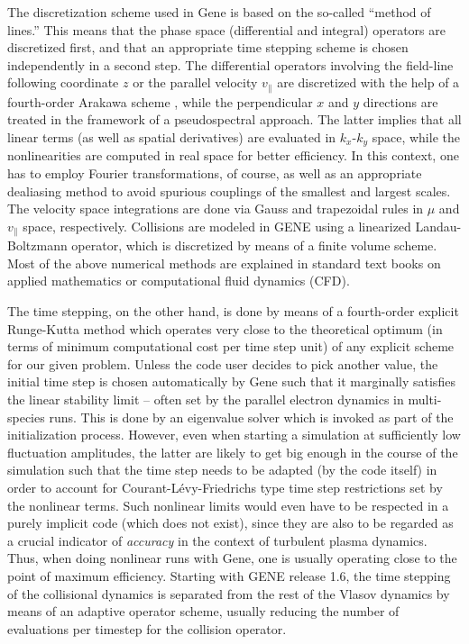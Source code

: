 \documentclass[12pt]{article}
\begin{document}
The discretization scheme used in {\sc Gene} is based on the so-called ``method of lines.'' This
means that the phase space (differential and integral) operators are discretized first, and that
an appropriate time stepping scheme is chosen independently in a second step. The differential
operators involving the field-line following coordinate $z$ or the parallel velocity $v_\|$ are
discretized with the help of a fourth-order Arakawa scheme \cite{Arakawa66}, while the
perpendicular $x$ and $y$ directions are treated in the framework of a pseudospectral approach.
The latter implies that all linear terms (as well as spatial derivatives) are evaluated in
$k_x$-$k_y$ space, while the nonlinearities are computed in real space for better efficiency.
In this context, one has to employ Fourier transformations, of course, as well as an appropriate
dealiasing method to avoid spurious couplings of the smallest and largest scales. The velocity
space integrations are done via Gauss and trapezoidal rules in $\mu$ and $v_\|$ space, respectively.
Collisions are modeled in GENE using a linearized Landau-Boltzmann operator, which is discretized
by means of a finite volume scheme. Most of the above numerical methods are explained in standard 
text books on applied mathematics or computational fluid dynamics (CFD).

The time stepping, on the other hand, is done by means of a fourth-order explicit Runge-Kutta method
which operates very close to the theoretical optimum (in terms of minimum computational cost per
time step unit) of any explicit scheme for our given problem. Unless the code user decides to pick
another value, the initial time step is chosen automatically by {\sc Gene} such that it marginally
satisfies the linear stability limit -- often set by the parallel electron dynamics in multi-species
runs. This is done by an eigenvalue solver which is invoked as part of the initialization process.
However, even when starting a simulation at sufficiently low fluctuation amplitudes, the latter are
likely to get big enough in the course of the simulation such that the time step needs to be adapted
(by the code itself) in order to account for Courant-L\'evy-Friedrichs type time step restrictions
set by the nonlinear terms. Such nonlinear limits would even have to be respected in a purely implicit
code (which does not exist), since they are also to be regarded as a crucial indicator of {\em accuracy}
in the context of turbulent plasma dynamics. Thus, when doing nonlinear runs with {\sc Gene}, one is
usually operating close to the point of maximum efficiency.
Starting with GENE release 1.6, the time stepping of the collisional dynamics is separated from the 
rest of the Vlasov dynamics by means of an adaptive operator scheme, usually reducing the number of
evaluations per timestep for the collision operator.
\end{document}
